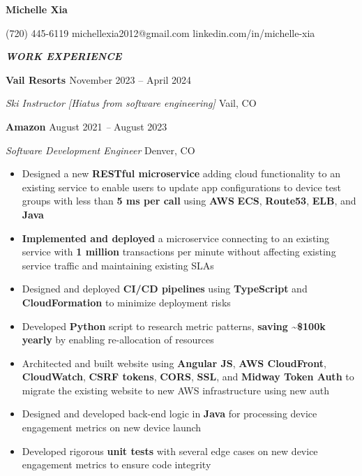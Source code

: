 \documentclass[
]{article}
\author{}
\date{}
\providecommand{\tightlist}{%
  \setlength{\itemsep}{0pt}\setlength{\parskip}{0pt}}
\begin{document}
\textbf{Michelle Xia}

(720) 445-6119 {\emph{\textbar{}} }michellexia2012@gmail.com{
\emph{\textbar{}} }{linkedin.com/in/michelle-xia}

\hfill\break

{\textbf{\emph{WORK EXPERIENCE}}}

\textbf{Vail Resorts{ }}November 2023 -- April 2024

\emph{Ski Instructor {[}Hiatus from software engineering{]}{ }}Vail, CO

\hfill\break

\textbf{Amazon}{\textbf{\emph{{ }}}}August 2021 {\emph{--} }August 2023

\emph{Software Development Engineer}{\emph{{ }}}Denver, CO

\begin{itemize}
\tightlist
\item
  Designed a new \textbf{RESTful microservice} adding cloud
  functionality to an existing service to enable users to update app
  configurations to device test groups with less than \textbf{5 ms per
  call} using \textbf{AWS} \textbf{ECS}, \textbf{Route53}, \textbf{ELB},
  and \textbf{Java}{~}
\item
  \textbf{Implemented and deployed} a microservice connecting to an
  existing service with \textbf{1 million} transactions per minute
  without affecting existing service traffic and maintaining existing
  SLAs
\item
  Designed and deployed \textbf{CI/CD pipelines} using
  \textbf{TypeScript} and \textbf{CloudFormation} to minimize deployment
  risks
\item
  Developed \textbf{Python} script to research metric patterns,
  \textbf{saving \textasciitilde\$100k yearly} by enabling re-allocation
  of resources
\item
  Architected and built website using \textbf{Angular JS}, \textbf{AWS
  CloudFront}, \textbf{CloudWatch}, \textbf{CSRF tokens}, \textbf{CORS},
  \textbf{SSL}, and \textbf{Midway Token Auth} to migrate the existing
  website to new AWS infrastructure using new auth
\item
  Designed and developed back-end logic in \textbf{Java} for processing
  device engagement metrics on new device launch
\item
  Developed rigorous \textbf{unit tests} with several edge cases on new
  device engagement metrics to ensure code integrity
\end{itemize}
\end{document}
